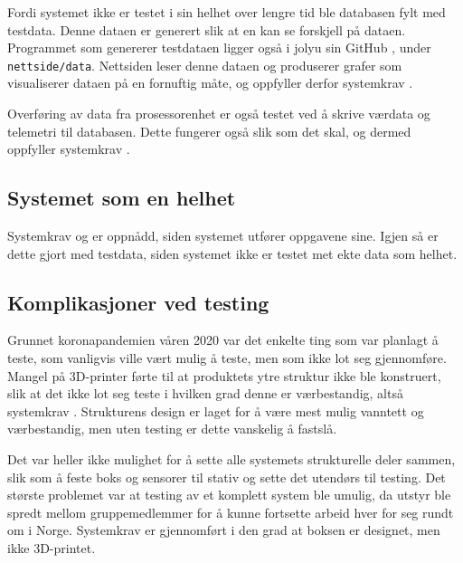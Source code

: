 Fordi systemet ikke er testet i sin helhet over lengre tid ble databasen fylt med testdata. 
Denne dataen er generert slik at en kan se forskjell på dataen. 
Programmet som genererer testdataen ligger også i jolyu sin GitHub \cite{GitHub}, under \texttt{nettside/data}. 
Nettsiden leser denne dataen og produserer grafer som visualiserer dataen på en fornuftig måte, og oppfyller derfor systemkrav . 

Overføring av data fra prosessorenhet er også testet ved å skrive værdata og telemetri til databasen. 
Dette fungerer også slik som det skal, og dermed oppfyller systemkrav .


\subsection{Systemet som en helhet}\label{sec:verifikasjon:helhet}
Systemkrav  og  er oppnådd, siden systemet utfører oppgavene sine. 
Igjen så er dette gjort med testdata, siden systemet ikke er testet met ekte data som helhet.



\subsection{Komplikasjoner ved testing}\label{sec:verifikasjon:kowona}

Grunnet koronapandemien våren 2020 var det enkelte ting som var planlagt å teste, som vanligvis ville vært mulig å teste, men som ikke lot seg gjennomføre. 
Mangel på 3D-printer førte til at produktets ytre struktur ikke ble konstruert, slik at det ikke lot seg teste i hvilken grad denne er værbestandig, altså systemkrav . 
Strukturens design er laget for å være mest mulig vanntett og værbestandig, men uten testing er dette vanskelig å fastslå.

Det var heller ikke mulighet for å sette alle systemets strukturelle deler sammen, slik som å feste boks og sensorer til stativ og sette det utendørs til testing.
Det største problemet var at testing av et komplett system ble umulig, da utstyr ble spredt mellom gruppemedlemmer for å kunne fortsette arbeid hver for seg rundt om i Norge. 
Systemkrav  er gjennomført i den grad at boksen er designet, men ikke 3D-printet. 
